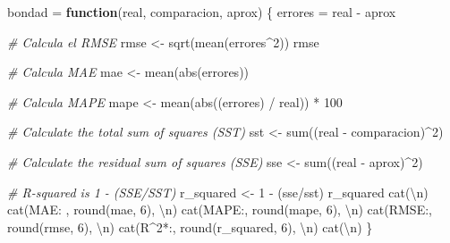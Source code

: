 \documentclass[
]{article}
\newenvironment{Shaded}{\begin{snugshade}}{\end{snugshade}}
\newcommand{\CommentTok}[1]{\textcolor[rgb]{0.56,0.35,0.01}{\textit{#1}}}
\newcommand{\ControlFlowTok}[1]{\textcolor[rgb]{0.13,0.29,0.53}{\textbf{#1}}}
\newcommand{\DecValTok}[1]{\textcolor[rgb]{0.00,0.00,0.81}{#1}}
\newcommand{\FunctionTok}[1]{\textcolor[rgb]{0.00,0.00,0.00}{#1}}
\newcommand{\NormalTok}[1]{#1}
\newcommand{\OtherTok}[1]{\textcolor[rgb]{0.56,0.35,0.01}{#1}}
\newcommand{\SpecialCharTok}[1]{\textcolor[rgb]{0.00,0.00,0.00}{#1}}
\newcommand{\StringTok}[1]{\textcolor[rgb]{0.31,0.60,0.02}{#1}}
\begin{document}
\begin{Shaded}
\begin{Highlighting}[]
\NormalTok{bondad }\OtherTok{=} \ControlFlowTok{function}\NormalTok{(real, comparacion, aprox) \{}
\NormalTok{  errores }\OtherTok{=}\NormalTok{ real }\SpecialCharTok{{-}}\NormalTok{ aprox}

  \CommentTok{\# Calcula el RMSE}
\NormalTok{  rmse }\OtherTok{\textless{}{-}} \FunctionTok{sqrt}\NormalTok{(}\FunctionTok{mean}\NormalTok{(errores}\SpecialCharTok{\^{}}\DecValTok{2}\NormalTok{))}
\NormalTok{  rmse}
  
  \CommentTok{\# Calcula MAE}
\NormalTok{  mae }\OtherTok{\textless{}{-}} \FunctionTok{mean}\NormalTok{(}\FunctionTok{abs}\NormalTok{(errores))}
  
  \CommentTok{\# Calcula MAPE}
\NormalTok{  mape }\OtherTok{\textless{}{-}} \FunctionTok{mean}\NormalTok{(}\FunctionTok{abs}\NormalTok{((errores) }\SpecialCharTok{/}\NormalTok{ real)) }\SpecialCharTok{*} \DecValTok{100}


  \CommentTok{\# Calculate the total sum of squares (SST)}
\NormalTok{  sst }\OtherTok{\textless{}{-}} \FunctionTok{sum}\NormalTok{((real }\SpecialCharTok{{-}}\NormalTok{ comparacion)}\SpecialCharTok{\^{}}\DecValTok{2}\NormalTok{)}
  
  \CommentTok{\# Calculate the residual sum of squares (SSE)}
\NormalTok{  sse }\OtherTok{\textless{}{-}} \FunctionTok{sum}\NormalTok{((real }\SpecialCharTok{{-}}\NormalTok{ aprox)}\SpecialCharTok{\^{}}\DecValTok{2}\NormalTok{)}
  
  \CommentTok{\# R{-}squared is 1 {-} (SSE/SST)}
\NormalTok{  r\_squared }\OtherTok{\textless{}{-}} \DecValTok{1} \SpecialCharTok{{-}}\NormalTok{ (sse}\SpecialCharTok{/}\NormalTok{sst)}
\NormalTok{  r\_squared}
  \FunctionTok{cat}\NormalTok{(}\StringTok{\textquotesingle{}}\SpecialCharTok{\textbackslash{}n}\StringTok{\textquotesingle{}}\NormalTok{)}
  \FunctionTok{cat}\NormalTok{(}\StringTok{\textquotesingle{}MAE: \textquotesingle{}}\NormalTok{, }\FunctionTok{round}\NormalTok{(mae, }\DecValTok{6}\NormalTok{), }\StringTok{\textquotesingle{}}\SpecialCharTok{\textbackslash{}n}\StringTok{\textquotesingle{}}\NormalTok{)}
  \FunctionTok{cat}\NormalTok{(}\StringTok{\textquotesingle{}MAPE:\textquotesingle{}}\NormalTok{, }\FunctionTok{round}\NormalTok{(mape, }\DecValTok{6}\NormalTok{), }\StringTok{\textquotesingle{}}\SpecialCharTok{\textbackslash{}n}\StringTok{\textquotesingle{}}\NormalTok{)}
  \FunctionTok{cat}\NormalTok{(}\StringTok{\textquotesingle{}RMSE:\textquotesingle{}}\NormalTok{, }\FunctionTok{round}\NormalTok{(rmse, }\DecValTok{6}\NormalTok{), }\StringTok{\textquotesingle{}}\SpecialCharTok{\textbackslash{}n}\StringTok{\textquotesingle{}}\NormalTok{)}
  \FunctionTok{cat}\NormalTok{(}\StringTok{\textquotesingle{}R\^{}2*:\textquotesingle{}}\NormalTok{, }\FunctionTok{round}\NormalTok{(r\_squared, }\DecValTok{6}\NormalTok{), }\StringTok{\textquotesingle{}}\SpecialCharTok{\textbackslash{}n}\StringTok{\textquotesingle{}}\NormalTok{)}
  \FunctionTok{cat}\NormalTok{(}\StringTok{\textquotesingle{}}\SpecialCharTok{\textbackslash{}n}\StringTok{\textquotesingle{}}\NormalTok{)}
\NormalTok{\}}


\end{Highlighting}
\end{Shaded}
\end{document}
